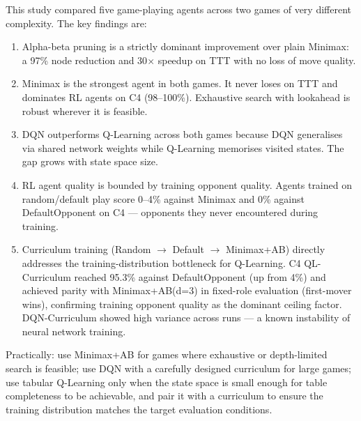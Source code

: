 \documentclass[11pt,a4paper]{article}
\begin{document}
This study compared five game-playing agents across two games of very different complexity. The key
findings are:

\begin{enumerate}[noitemsep]
    \item Alpha-beta pruning is a strictly dominant improvement over plain Minimax: a 97\% node
    reduction and 30$\times$ speedup on TTT with no loss of move quality.
    \item Minimax is the strongest agent in both games. It never loses on TTT and dominates RL
    agents on C4 (98--100\%). Exhaustive search with lookahead is robust wherever it is feasible.
    \item DQN outperforms Q-Learning across both games because DQN generalises via shared network
    weights while Q-Learning memorises visited states. The gap grows with state space size.
    \item RL agent quality is bounded by training opponent quality. Agents trained on random/default
    play score 0--4\% against Minimax and 0\% against DefaultOpponent on C4 --- opponents they never
    encountered during training.
    \item Curriculum training (Random $\rightarrow$ Default $\rightarrow$ Minimax+AB) directly
    addresses the training-distribution bottleneck for Q-Learning. C4 QL-Curriculum reached 95.3\%
    against DefaultOpponent (up from 4\%) and achieved parity with Minimax+AB(d=3) in fixed-role
    evaluation (first-mover wins), confirming training opponent quality as the dominant ceiling factor.
    DQN-Curriculum showed high variance across runs --- a known instability of neural network training.
\end{enumerate}

Practically: use Minimax+AB for games where exhaustive or depth-limited search is feasible; use DQN
with a carefully designed curriculum for large games; use tabular Q-Learning only when the state
space is small enough for table completeness to be achievable, and pair it with a curriculum to
ensure the training distribution matches the target evaluation conditions.
\end{document}
